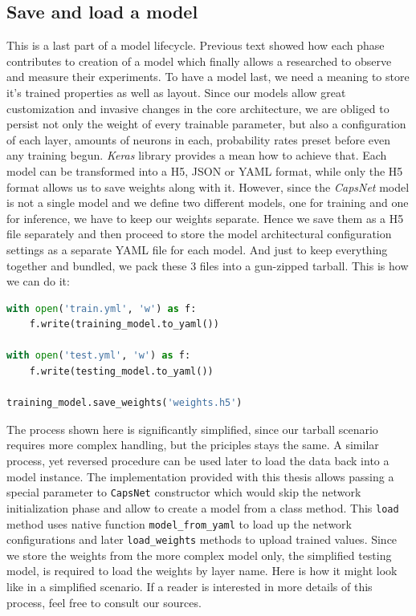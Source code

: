\subsection{Save and load a model}
\label{ss:save_model}

This is a last part of a model lifecycle. Previous text showed how each phase contributes to creation of a model which finally allows a researched to observe and measure their experiments. To have a model last, we need a meaning to store it's trained properties as well as layout. Since our models allow great customization and invasive changes in the core architecture, we are obliged to persist not only the weight of every trainable parameter, but also a configuration of each layer, amounts of neurons in each, probability rates preset before even any training begun. \textit{Keras} library provides a mean how to achieve that. Each model can be transformed into a H5, JSON or YAML format, while only the H5 format allows us to save weights along with it. However, since the \textit{CapsNet} model is not a single model and we define two different models, one for training and one for inference, we have to keep our weights separate. Hence we save them as a H5 file separately and then proceed to store the model architectural configuration settings as a separate YAML file for each model. And just to keep everything together and bundled, we pack these 3 files into a gun-zipped tarball. This is how we can do it:

\begin{lstlisting}[language=Python, caption=Saving a model in \textit{Keras}]
with open('train.yml', 'w') as f:
    f.write(training_model.to_yaml())

with open('test.yml', 'w') as f:
    f.write(testing_model.to_yaml())

training_model.save_weights('weights.h5')
\end{lstlisting}

The process shown here is significantly simplified, since our tarball scenario requires more complex handling, but the priciples stays the same. A similar process, yet reversed procedure can be used later to load the data back into a model instance. The implementation provided with this thesis allows passing a special parameter to \texttt{CapsNet} constructor which would skip the network initialization phase and allow to create a model from a class method. This \texttt{load} method uses native function \texttt{model\_from\_yaml} to load up the network configurations and later \texttt{load\_weights} methods to upload trained values. Since we store the weights from the more complex model only, the simplified testing model, is required to load the weights by layer name. Here is how it might look like in a simplified scenario. If a reader is interested in more details of this process, feel free to consult our sources.


